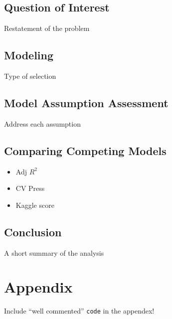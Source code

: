 \documentclass[american,]{article}
\providecommand{\tightlist}{%
  \setlength{\itemsep}{0pt}\setlength{\parskip}{0pt}}
\begin{document}
\hypertarget{question-of-interest-1}{%
\subsection{Question of Interest}\label{question-of-interest-1}}

Restatement of the problem

\hypertarget{modeling-1}{%
\subsection{Modeling}\label{modeling-1}}

Type of selection

\hypertarget{model-assumption-assessment-1}{%
\subsection{Model Assumption
Assessment}\label{model-assumption-assessment-1}}

Address each assumption

\hypertarget{comparing-competing-models-1}{%
\subsection{Comparing Competing
Models}\label{comparing-competing-models-1}}

\begin{itemize}
\tightlist
\item
  Adj \(R^2\)
\item
  CV Press
\item
  Kaggle score
\end{itemize}

\hypertarget{conclusion-1}{%
\subsection{Conclusion}\label{conclusion-1}}

A short summary of the analysis

\hypertarget{appendix}{%
\section{Appendix}\label{appendix}}

Include ``well commented'' \texttt{code} in the appendex!

\renewcommand\refname{References}

\end{document}
